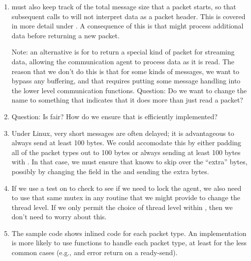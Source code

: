 \begin{enumerate}
\item {} must also keep track of the total message size that
  a packet starts, so that subsequent calls to  will not
  interpret data as a packet header.  This is covered in more detail under
  .  A consequence of this is that
   might process additional data before returning a new
  packet.

  Note: an alternative is for  to return a special
  kind of packet for streaming data, allowing the communication agent to
  process data as it is read.  The reason that we don't do this is that for
  some kinds of messages, we want to bypass any buffering, and that requires
  putting some message handling into the lower level communication functions.
  Question: Do we want to change the name to something that indicates that it
  does more than just read a packet?

\item Question: Is  fair?  How do we ensure that
   is efficiently implemented?

\item Under Linux, very short messages are often delayed; it is advantageous
  to always send at least 100 bytes.  We could accomodate this by either
  padding all of the packet types out to 100 bytes or always sending at least
  100 bytes with .  In that case, we must ensure that
   knows to skip over the ``extra'' bytes, possibly by
  changing the  field in the  and sending the extra
  bytes.  

\item If we use a test on  to check to see if we
  need to lock the agent, we also need to use that same mutex in any routine
  that we might provide to change the thread level.  If we only permit the
  choice of thread level within , then we don't need
  to worry about this.

\item The sample code shows inlined code for each packet type.  An
  implementation is more likely to use functions to handle each packet type,
  at least for the less common cases (e.g.,  and
  error return on a ready-send).
\end{enumerate}


